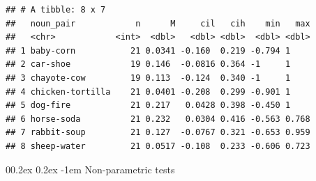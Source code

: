 \documentclass[
  doc,floatsintext]{apa6}
\makeatletter
\newenvironment{Shaded}{\begin{snugshade}}{\end{snugshade}}
\newcommand{\AttributeTok}[1]{\textcolor[rgb]{0.13,0.29,0.53}{#1}}
\newcommand{\CommentTok}[1]{\textcolor[rgb]{0.56,0.35,0.01}{\textit{#1}}}
\newcommand{\DecValTok}[1]{\textcolor[rgb]{0.00,0.00,0.81}{#1}}
\newcommand{\FunctionTok}[1]{\textcolor[rgb]{0.13,0.29,0.53}{\textbf{#1}}}
\newcommand{\NormalTok}[1]{#1}
\newcommand{\OtherTok}[1]{\textcolor[rgb]{0.56,0.35,0.01}{#1}}
\newcommand{\SpecialCharTok}[1]{\textcolor[rgb]{0.81,0.36,0.00}{\textbf{#1}}}
\newcommand{\StringTok}[1]{\textcolor[rgb]{0.31,0.60,0.02}{#1}}
\let\oldparagraph\paragraph
\renewcommand{\paragraph}{
    \@ifstar
      \xxxParagraphStar
      \xxxParagraphNoStar
  }
\newcommand{\xxxParagraphStar}[1]{\oldparagraph*{#1}\mbox{}}
\newcommand{\xxxParagraphNoStar}[1]{\oldparagraph{#1}\mbox{}}
\renewcommand{\paragraph}{\@startsection{paragraph}{4}{\parindent}%
  {0\baselineskip \@plus 0.2ex \@minus 0.2ex}%
  {-1em}%
  {\normalfont\normalsize\bfseries\itshape\typesectitle}}
\makeatother
\begin{document}
\begin{verbatim}
## # A tibble: 8 x 7
##   noun_pair            n      M     cil   cih    min   max
##   <chr>            <int>  <dbl>   <dbl> <dbl>  <dbl> <dbl>
## 1 baby-corn           21 0.0341 -0.160  0.219 -0.794 1    
## 2 car-shoe            19 0.146  -0.0816 0.364 -1     1    
## 3 chayote-cow         19 0.113  -0.124  0.340 -1     1    
## 4 chicken-tortilla    21 0.0401 -0.208  0.299 -0.901 1    
## 5 dog-fire            21 0.217   0.0428 0.398 -0.450 1    
## 6 horse-soda          21 0.232   0.0304 0.416 -0.563 0.768
## 7 rabbit-soup         21 0.127  -0.0767 0.321 -0.653 0.959
## 8 sheep-water         21 0.0517 -0.108  0.233 -0.606 0.723
\end{verbatim}

\paragraph{Non-parametric tests}\label{non-parametric-tests}

\begin{Shaded}
\end{Shaded}

\begin{Shaded}
\end{Shaded}

\begin{Shaded}
\end{Shaded}
\end{document}

